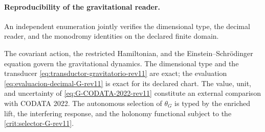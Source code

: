 \paragraph{Reproducibility of the gravitational reader.}
An independent enumeration jointly verifies the dimensional type, the
decimal reader, and the monodromy identities on the declared finite
domain.

\begin{proposition}
The covariant action, the restricted Hamiltonian, and the
Einstein--Schrödinger equation govern the gravitational dynamics. The dimensional type
and the transducer \eqref{eq:transductor-gravitatorio-rev11} are exact; the
evaluation \eqref{eq:evaluacion-decimal-G-rev11} is exact for its declared
chart. The value, unit, and uncertainty of
\eqref{eq:G-CODATA-2022-rev11} constitute an external comparison with CODATA 2022. The
autonomous selection of \(\theta_G\) is typed by the enriched
lift, the interfering response, and the holonomy functional subject
to the \cref{crit:selector-G-rev11}.
\end{proposition}
